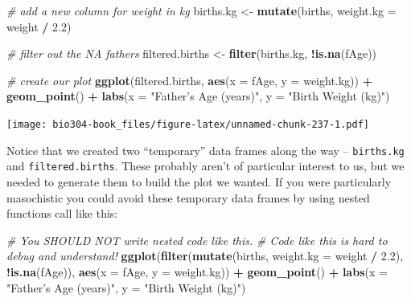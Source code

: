 \documentclass[]{book}
\newenvironment{Shaded}{\begin{snugshade}}{\end{snugshade}}
\newcommand{\CommentTok}[1]{\textcolor[rgb]{0.56,0.35,0.01}{\textit{#1}}}
\newcommand{\DataTypeTok}[1]{\textcolor[rgb]{0.13,0.29,0.53}{#1}}
\newcommand{\FloatTok}[1]{\textcolor[rgb]{0.00,0.00,0.81}{#1}}
\newcommand{\KeywordTok}[1]{\textcolor[rgb]{0.13,0.29,0.53}{\textbf{#1}}}
\newcommand{\NormalTok}[1]{#1}
\newcommand{\OperatorTok}[1]{\textcolor[rgb]{0.81,0.36,0.00}{\textbf{#1}}}
\newcommand{\StringTok}[1]{\textcolor[rgb]{0.31,0.60,0.02}{#1}}
\theoremstyle{definition}
\theoremstyle{definition}
\theoremstyle{definition}
\theoremstyle{remark}
\begin{document}
\begin{Shaded}
\begin{Highlighting}[]
\CommentTok{# add a new column for weight in kg}
\NormalTok{births.kg <-}\StringTok{ }\KeywordTok{mutate}\NormalTok{(births, }\DataTypeTok{weight.kg =}\NormalTok{ weight }\OperatorTok{/}\StringTok{ }\FloatTok{2.2}\NormalTok{)}

\CommentTok{# filter out the NA fathers}
\NormalTok{filtered.births <-}\StringTok{ }\KeywordTok{filter}\NormalTok{(births.kg, }\OperatorTok{!}\KeywordTok{is.na}\NormalTok{(fAge))}

\CommentTok{# create our plot}
\KeywordTok{ggplot}\NormalTok{(filtered.births, }\KeywordTok{aes}\NormalTok{(}\DataTypeTok{x =}\NormalTok{ fAge, }\DataTypeTok{y =}\NormalTok{ weight.kg)) }\OperatorTok{+}\StringTok{ }
\StringTok{  }\KeywordTok{geom_point}\NormalTok{() }\OperatorTok{+}\StringTok{ }
\StringTok{  }\KeywordTok{labs}\NormalTok{(}\DataTypeTok{x =} \StringTok{"Father's Age (years)"}\NormalTok{, }\DataTypeTok{y =} \StringTok{"Birth Weight (kg)"}\NormalTok{)}
\end{Highlighting}
\end{Shaded}

\texttt{[image: bio304-book\_files/figure-latex/unnamed-chunk-237-1.pdf]}

Notice that we created two ``temporary'' data frames along the way --
\texttt{births.kg} and \texttt{filtered.births}. These probably aren't
of particular interest to us, but we needed to generate them to build
the plot we wanted. If you were particularly masochistic you could avoid
these temporary data frames by using nested functions call like this:

\begin{Shaded}
\begin{Highlighting}[]
\CommentTok{# You SHOULD NOT write nested code like this.}
\CommentTok{# Code like this is hard to debug and understand!}
\KeywordTok{ggplot}\NormalTok{(}\KeywordTok{filter}\NormalTok{(}\KeywordTok{mutate}\NormalTok{(births, }\DataTypeTok{weight.kg =}\NormalTok{ weight }\OperatorTok{/}\StringTok{ }\FloatTok{2.2}\NormalTok{), }\OperatorTok{!}\KeywordTok{is.na}\NormalTok{(fAge)), }
       \KeywordTok{aes}\NormalTok{(}\DataTypeTok{x =}\NormalTok{ fAge, }\DataTypeTok{y =}\NormalTok{ weight.kg)) }\OperatorTok{+}\StringTok{ }
\StringTok{  }\KeywordTok{geom_point}\NormalTok{() }\OperatorTok{+}\StringTok{ }
\StringTok{  }\KeywordTok{labs}\NormalTok{(}\DataTypeTok{x =} \StringTok{"Father's Age (years)"}\NormalTok{, }\DataTypeTok{y =} \StringTok{"Birth Weight (kg)"}\NormalTok{)}
\end{Highlighting}
\end{Shaded}
\end{document}
